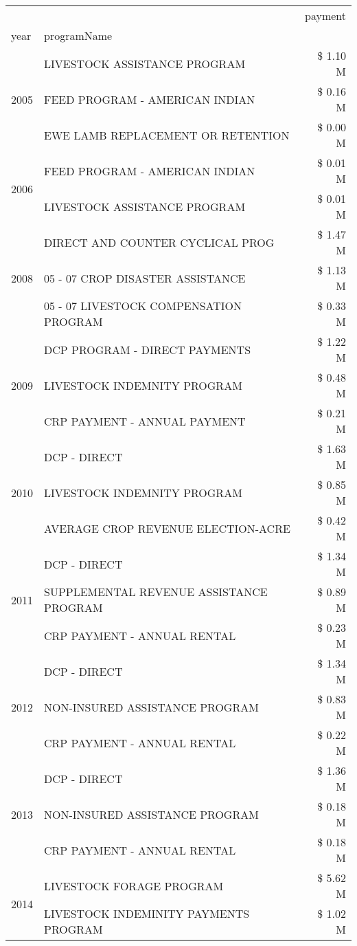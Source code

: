 \begin{tabular}{llr}
\toprule
 &  & payment \\
year & programName &  \\
\midrule
\multirow[t]{3}{*}{2005} & LIVESTOCK ASSISTANCE PROGRAM & \$ 1.10 M \\
 & FEED PROGRAM - AMERICAN INDIAN & \$ 0.16 M \\
 & EWE LAMB REPLACEMENT OR RETENTION & \$ 0.00 M \\
\cline{1-3}
\multirow[t]{2}{*}{2006} & FEED PROGRAM - AMERICAN INDIAN & \$ 0.01 M \\
 & LIVESTOCK ASSISTANCE PROGRAM & \$ 0.01 M \\
\cline{1-3}
\multirow[t]{3}{*}{2008} & DIRECT AND COUNTER CYCLICAL PROG & \$ 1.47 M \\
 & 05 - 07 CROP DISASTER ASSISTANCE & \$ 1.13 M \\
 & 05 - 07 LIVESTOCK COMPENSATION PROGRAM & \$ 0.33 M \\
\cline{1-3}
\multirow[t]{3}{*}{2009} & DCP PROGRAM - DIRECT PAYMENTS & \$ 1.22 M \\
 & LIVESTOCK INDEMNITY PROGRAM & \$ 0.48 M \\
 & CRP PAYMENT - ANNUAL PAYMENT & \$ 0.21 M \\
\cline{1-3}
\multirow[t]{3}{*}{2010} & DCP - DIRECT & \$ 1.63 M \\
 & LIVESTOCK INDEMNITY PROGRAM & \$ 0.85 M \\
 & AVERAGE CROP REVENUE ELECTION-ACRE & \$ 0.42 M \\
\cline{1-3}
\multirow[t]{3}{*}{2011} & DCP - DIRECT & \$ 1.34 M \\
 & SUPPLEMENTAL REVENUE ASSISTANCE PROGRAM & \$ 0.89 M \\
 & CRP PAYMENT - ANNUAL RENTAL & \$ 0.23 M \\
\cline{1-3}
\multirow[t]{3}{*}{2012} & DCP - DIRECT & \$ 1.34 M \\
 & NON-INSURED ASSISTANCE PROGRAM & \$ 0.83 M \\
 & CRP PAYMENT - ANNUAL RENTAL & \$ 0.22 M \\
\cline{1-3}
\multirow[t]{3}{*}{2013} & DCP - DIRECT & \$ 1.36 M \\
 & NON-INSURED ASSISTANCE PROGRAM & \$ 0.18 M \\
 & CRP PAYMENT - ANNUAL RENTAL & \$ 0.18 M \\
\cline{1-3}
\multirow[t]{3}{*}{2014} & LIVESTOCK FORAGE PROGRAM & \$ 5.62 M \\
 & LIVESTOCK INDEMINITY PAYMENTS PROGRAM & \$ 1.02 M \\

\end{tabular}
